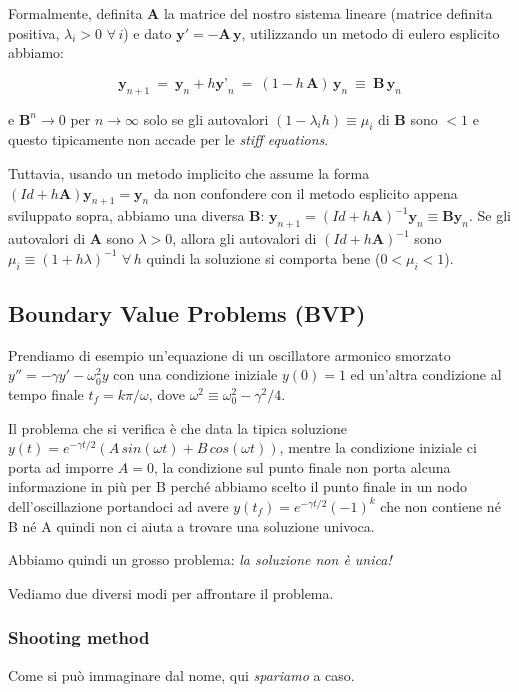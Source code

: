 Formalmente, definita $\textbf{A}$ la matrice del nostro sistema lineare (matrice definita positiva, $\lambda_i > 0 \, \, \forall\,  i$) e dato $\textbf{y}'=-\textbf{A}\, \textbf{y}$, utilizzando un metodo di eulero esplicito abbiamo:

\[ \textbf{y}_{n+1}\ =\ \textbf{y}_n + h\textbf{y'}_n\ =\  ( 1 - h\, \textbf{A} )\, \textbf{y}_n\ \equiv\ \textbf{B}\, \textbf{y}_n \]

e $\textbf{B}^n\rightarrow 0$ per $n\rightarrow \infty$ solo se gli autovalori $(1-\lambda_i h)\equiv \mu_i$ di \textbf{B} sono $<1$ e questo tipicamente non accade per le \emph{stiff equations}.

Tuttavia, usando un metodo implicito che assume la forma $\boxed{(Id + h\textbf{A}) \textbf{y}_{n+1} = \textbf{y}_n}$ da non confondere con il metodo esplicito appena sviluppato sopra, abbiamo una diversa \textbf{B}: $\textbf{y}_{n+1} = (Id + h\textbf{A})^{-1}\textbf{y}_n\equiv \textbf{B} \textbf{y}_n$.
Se gli autovalori di \textbf{A} sono $\lambda>0$, allora gli autovalori di $(Id+h\textbf{A})^{-1}$ sono $\mu_i\equiv(1+h\lambda)^{-1}\, \, \forall\, h$ quindi la soluzione si comporta bene ($0<\mu_i<1$).




%
%
\vspace{0.5cm}
\subsection{Boundary Value Problems (BVP)}

Prendiamo di esempio un'equazione di un oscillatore armonico smorzato $y''=-\gamma y' -\omega_0^2 y$ con una condizione iniziale $y(0)=1$ ed un'altra condizione al tempo finale $t_f=k\pi/\omega$, dove $\omega^2 \equiv \omega^2_0-\gamma^2/4$.

Il problema che si verifica è che data la tipica soluzione $y(t)=e^{-\gamma t/2}(A\,sin(\omega t)+B\,cos(\omega t))$, mentre la condizione iniziale ci porta ad imporre $A=0$, la condizione sul punto finale non porta alcuna informazione in più per B perché abbiamo scelto il punto finale in un nodo dell'oscillazione portandoci ad avere $y(t_f)=e^{-\gamma t/2} (-1)^k$ che non contiene né B né A quindi non ci aiuta a trovare una soluzione univoca.

Abbiamo quindi un grosso problema: \emph{la soluzione non è unica!}

Vediamo due diversi modi per affrontare il problema.

\subsubsection{Shooting method}
Come si può immaginare dal nome, qui \emph{spariamo} a caso.

